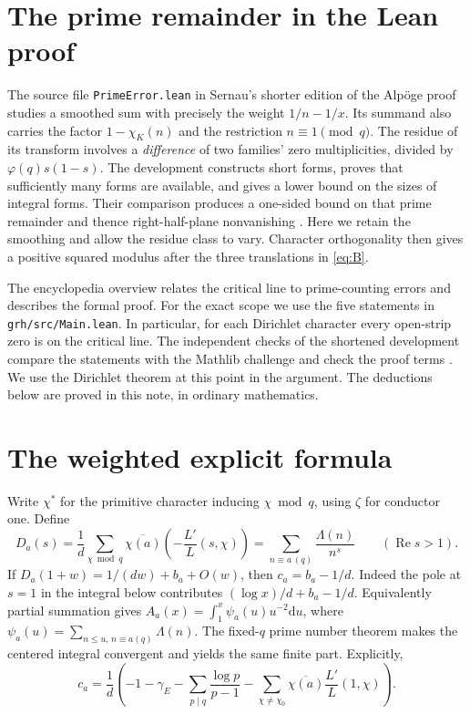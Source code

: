 \documentclass[11pt]{article}
\newcommand{\dd}{\mathrm d}
\newcommand{\re}{\operatorname{Re}}
\begin{document}
\section{The prime remainder in the Lean proof}
The source file \texttt{PrimeError.lean} in Sernau's shorter edition of the Alp\"oge proof studies a smoothed sum with precisely the weight $1/n-1/x$. Its summand also carries the factor $1-\chi_K(n)$ and the restriction $n\equiv1\pmod q$. The residue of its transform involves a \emph{difference} of two families' zero multiplicities, divided by $\varphi(q)s(1-s)$. The development constructs short forms, proves that sufficiently many forms are available, and gives a lower bound on the sizes of integral forms. Their comparison produces a one-sided bound on that prime remainder and thence right-half-plane nonvanishing \cite{repo}. Here we retain the smoothing and allow the residue class to vary. Character orthogonality then gives a positive squared modulus after the three translations in \eqref{eq:B}.

The encyclopedia overview \cite{wiki} relates the critical line to prime-counting errors and describes the formal proof. For the exact scope we use the five statements in \texttt{grh/src/Main.lean}. In particular, for each Dirichlet character every open-strip zero is on the critical line. The independent checks of the shortened development compare the statements with the Mathlib challenge and check the proof terms \cite{verify}. We use the Dirichlet theorem at this point in the argument. The deductions below are proved in this note, in ordinary mathematics.

\section{The weighted explicit formula}\label{sec:ramp}
Write $\chi^*$ for the primitive character inducing $\chi\bmod q$, using $\zeta$ for conductor one. Define
\[
 D_a(s)=\frac1d\sum_{\chi\bmod q}\overline{\chi(a)}
        \left(-\frac{L'}L(s,\chi)\right)
       =\sum_{n\equiv a\, (q)}\frac{\Lambda(n)}{n^s}\qquad(\re s>1).
\]
If $D_a(1+w)=1/(dw)+b_a+O(w)$, then $c_a=b_a-1/d$. Indeed the pole at $s=1$ in the integral below contributes $(\log x)/d+b_a-1/d$. Equivalently partial summation gives $A_a(x)=\int_1^x\psi_a(u)u^{-2}\dd u$, where $\psi_a(u)=\sum_{n\le u,\, n\equiv a(q)}\Lambda(n)$. The fixed-$q$ prime number theorem makes the centered integral convergent and yields the same finite part. Explicitly,
\[
 c_a=\frac1d\left(-1-\gamma_E-\sum_{p\mid q}\frac{\log p}{p-1}
   -\sum_{\chi\ne\chi_0}\overline{\chi(a)}\frac{L'}L(1,\chi)\right).
\]
\end{document}
